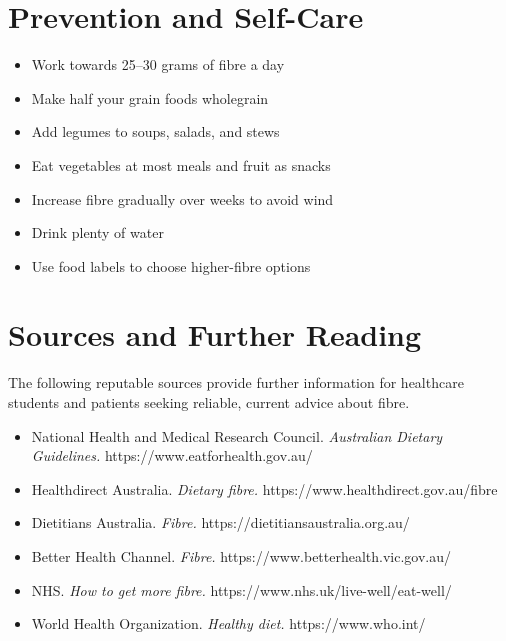 \section*{Prevention and Self-Care}
\begin{itemize}
    \item Work towards 25--30 grams of fibre a day
    \item Make half your grain foods wholegrain
    \item Add legumes to soups, salads, and stews
    \item Eat vegetables at most meals and fruit as snacks
    \item Increase fibre gradually over weeks to avoid wind
    \item Drink plenty of water
    \item Use food labels to choose higher-fibre options
\end{itemize}

\section*{Sources and Further Reading}
The following reputable sources provide further information for healthcare students and patients seeking reliable, current advice about fibre.
\begin{itemize}
    \item National Health and Medical Research Council. \textit{Australian Dietary Guidelines.} https://www.eatforhealth.gov.au/
    \item Healthdirect Australia. \textit{Dietary fibre.} https://www.healthdirect.gov.au/fibre
    \item Dietitians Australia. \textit{Fibre.} https://dietitiansaustralia.org.au/
    \item Better Health Channel. \textit{Fibre.} https://www.betterhealth.vic.gov.au/
    \item NHS. \textit{How to get more fibre.} https://www.nhs.uk/live-well/eat-well/
    \item World Health Organization. \textit{Healthy diet.} https://www.who.int/
\end{itemize}
